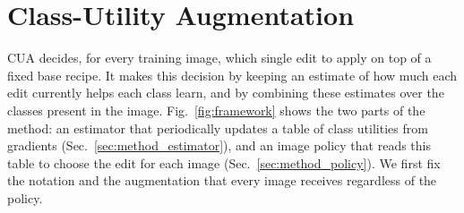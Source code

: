 \section{Class-Utility Augmentation}
\label{sec:method}

CUA decides, for every training image, which single edit to apply on top of a fixed base recipe. It makes this decision by keeping an estimate of how much each edit currently helps each class learn, and by combining these estimates over the classes present in the image. Fig.~\ref{fig:framework} shows the two parts of the method: an estimator that periodically updates a table of class utilities from gradients (Sec.~\ref{sec:method_estimator}), and an image policy that reads this table to choose the edit for each image (Sec.~\ref{sec:method_policy}). We first fix the notation and the augmentation that every image receives regardless of the policy.

